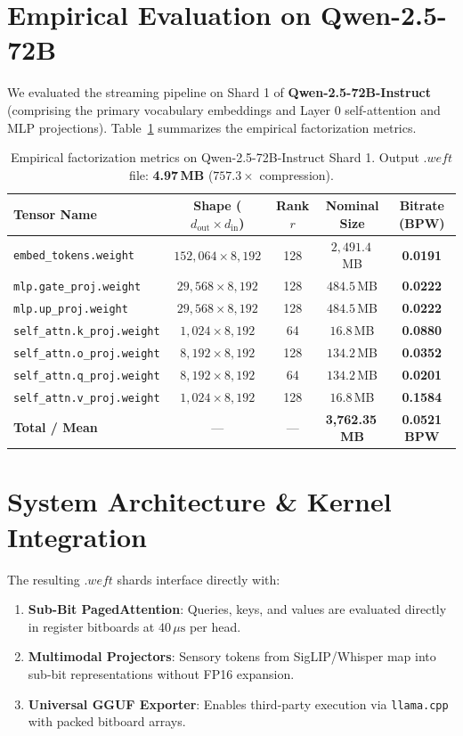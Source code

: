 \documentclass[11pt,a4paper]{article}
\begin{document}
\section{Empirical Evaluation on Qwen-2.5-72B}
We evaluated the streaming pipeline on Shard 1 of \textbf{Qwen-2.5-72B-Instruct} (comprising the primary vocabulary embeddings and Layer 0 self-attention and MLP projections). Table~\ref{tab:qwen_results} summarizes the empirical factorization metrics.

\begin{table}[h!]
\centering
\small
\begin{tabular}{lcccc}
\toprule
\textbf{Tensor Name} & \textbf{Shape ($d_{\text{out}} \times d_{\text{in}}$)} & \textbf{Rank $r$} & \textbf{Nominal Size} & \textbf{Bitrate (BPW)} \\
\midrule
\texttt{embed\_tokens.weight} & $152,064 \times 8,192$ & 128 & $2,491.4$\,MB & \textbf{0.0191} \\
\texttt{mlp.gate\_proj.weight} & $29,568 \times 8,192$ & 128 & $484.5$\,MB & \textbf{0.0222} \\
\texttt{mlp.up\_proj.weight} & $29,568 \times 8,192$ & 128 & $484.5$\,MB & \textbf{0.0222} \\
\texttt{self\_attn.k\_proj.weight} & $1,024 \times 8,192$ & 64 & $16.8$\,MB & \textbf{0.0880} \\
\texttt{self\_attn.o\_proj.weight} & $8,192 \times 8,192$ & 128 & $134.2$\,MB & \textbf{0.0352} \\
\texttt{self\_attn.q\_proj.weight} & $8,192 \times 8,192$ & 64 & $134.2$\,MB & \textbf{0.0201} \\
\texttt{self\_attn.v\_proj.weight} & $1,024 \times 8,192$ & 128 & $16.8$\,MB & \textbf{0.1584} \\
\midrule
\textbf{Total / Mean} & --- & --- & \textbf{3,762.35\,MB} & \textbf{0.0521 BPW} \\
\bottomrule
\end{tabular}
\caption{Empirical factorization metrics on Qwen-2.5-72B-Instruct Shard 1. Output $.weft$ file: \textbf{4.97\,MB} ($757.3\times$ compression).}
\label{tab:qwen_results}
\end{table}

\section{System Architecture \& Kernel Integration}
The resulting $.weft$ shards interface directly with:
\begin{enumerate}
    \item \textbf{Sub-Bit PagedAttention}: Queries, keys, and values are evaluated directly in register bitboards at $40\,\mu\text{s}$ per head.
    \item \textbf{Multimodal Projectors}: Sensory tokens from SigLIP/Whisper map into sub-bit representations without FP16 expansion.
    \item \textbf{Universal GGUF Exporter}: Enables third-party execution via \texttt{llama.cpp} with packed bitboard arrays.
\end{enumerate}
\end{document}
